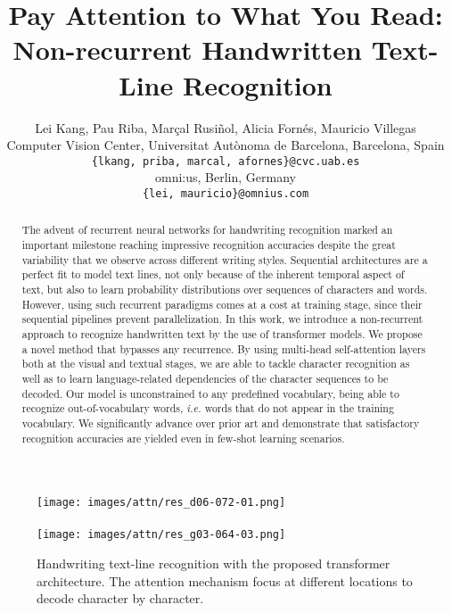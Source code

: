 \documentclass[10pt,twocolumn,letterpaper]{article}
\begin{document}
\title{Pay Attention to What You Read:\\ Non-recurrent Handwritten Text-Line Recognition}



\author{Lei Kang, Pau Riba, Mar\c{c}al Rusi{\~n}ol, Alicia Forn\'{e}s,  Mauricio Villegas \\
Computer Vision Center, Universitat Aut{\`o}noma de Barcelona, Barcelona, Spain\\
{\tt\small \{lkang, priba, marcal, afornes\}@cvc.uab.es}
\\
omni:us, Berlin, Germany\\
{\tt\small \{lei, mauricio\}@omnius.com}
}





\maketitle
\ifwacvfinal\thispagestyle{empty}\fi

\begin{abstract}
The advent of recurrent neural networks for handwriting recognition marked an important milestone reaching impressive recognition accuracies despite the great variability that we observe across different writing styles. Sequential architectures are a perfect fit to model text lines, not only because of the inherent temporal aspect of text, but also to learn probability distributions over sequences of characters and words. However, using such recurrent paradigms comes at a cost at training stage, since their sequential pipelines prevent parallelization. In this work, we introduce a non-recurrent approach to recognize handwritten text by the use of transformer models. We propose a novel method that bypasses any recurrence. By using multi-head self-attention layers both at the visual and textual stages, we are able to tackle character recognition as well as to learn language-related dependencies of the character sequences to be decoded. Our model is unconstrained to any predefined vocabulary, being able to recognize out-of-vocabulary words, \emph{i.e.} words that do not appear in the training vocabulary. We significantly advance over prior art and demonstrate that satisfactory recognition accuracies are yielded even in few-shot learning scenarios.
\end{abstract}




\begin{figure}
  \texttt{[image: images/attn/res\_d06-072-01.png]}\\
  \hfill\\
  \texttt{[image: images/attn/res\_g03-064-03.png]}
  \caption{Handwriting text-line recognition with the proposed transformer architecture. The attention mechanism focus at different locations to decode character by character.}
  \label{fig:teaser}
\end{figure}
\end{document}
